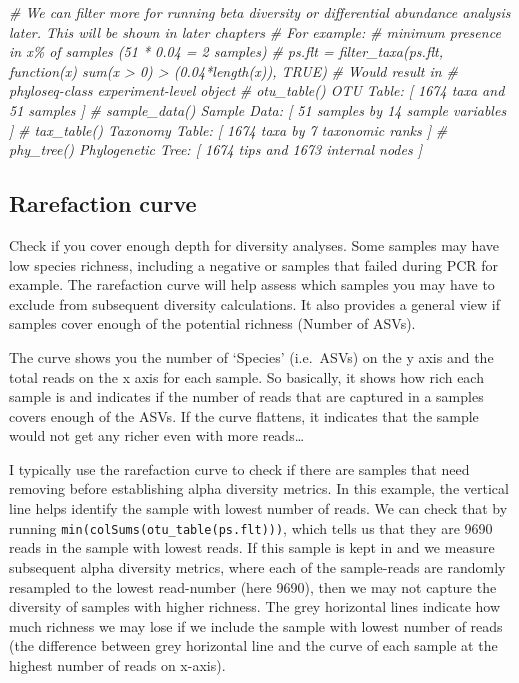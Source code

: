 \documentclass[
]{book}
\newenvironment{Shaded}{\begin{snugshade}}{\end{snugshade}}
\newcommand{\CommentTok}[1]{\textcolor[rgb]{0.56,0.35,0.01}{\textit{#1}}}
\begin{document}
\begin{Shaded}
\begin{Highlighting}[]
\CommentTok{\# We can filter more for running beta diversity or differential abundance analysis later. This will be shown in later chapters}
\CommentTok{\# For example: }
\CommentTok{\# minimum presence in x\% of samples (51 * 0.04 = 2 samples)}
\CommentTok{\# ps.flt = filter\_taxa(ps.flt, function(x) sum(x \textgreater{} 0) \textgreater{} (0.04*length(x)), TRUE) }
\CommentTok{\# Would result in }
\CommentTok{\# phyloseq{-}class experiment{-}level object}
\CommentTok{\# otu\_table()   OTU Table:         [ 1674 taxa and 51 samples ]}
\CommentTok{\# sample\_data() Sample Data:       [ 51 samples by 14 sample variables ]}
\CommentTok{\# tax\_table()   Taxonomy Table:    [ 1674 taxa by 7 taxonomic ranks ]}
\CommentTok{\# phy\_tree()    Phylogenetic Tree: [ 1674 tips and 1673 internal nodes ]}
\end{Highlighting}
\end{Shaded}

\hfill\break

\hypertarget{rarefaction-curve}{%
\subsection{Rarefaction curve}\label{rarefaction-curve}}

Check if you cover enough depth for diversity analyses. Some samples may have low species richness, including a negative or samples that failed during PCR for example. The rarefaction curve will help assess which samples you may have to exclude from subsequent diversity calculations. It also provides a general view if samples cover enough of the potential richness (Number of ASVs).

The curve shows you the number of `Species' (i.e.~ASVs) on the y axis and the total reads on the x axis for each sample. So basically, it shows how rich each sample is and indicates if the number of reads that are captured in a samples covers enough of the ASVs. If the curve flattens, it indicates that the sample would not get any richer even with more reads\ldots{}

I typically use the rarefaction curve to check if there are samples that need removing before establishing alpha diversity metrics. In this example, the vertical line helps identify the sample with lowest number of reads. We can check that by running \texttt{min(colSums(otu\_table(ps.flt)))}, which tells us that they are 9690 reads in the sample with lowest reads. If this sample is kept in and we measure subsequent alpha diversity metrics, where each of the sample-reads are randomly resampled to the lowest read-number (here 9690), then we may not capture the diversity of samples with higher richness. The grey horizontal lines indicate how much richness we may lose if we include the sample with lowest number of reads (the difference between grey horizontal line and the curve of each sample at the highest number of reads on x-axis).
\end{document}
